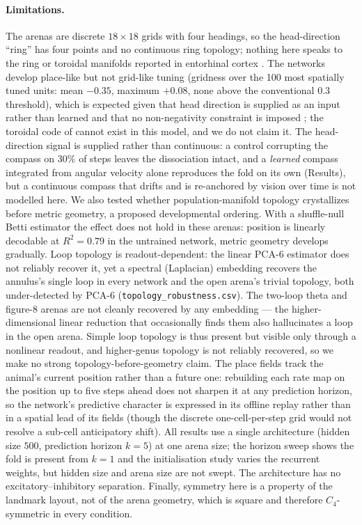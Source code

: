 \documentclass[9pt,lineno]{elife}
\begin{document}
\paragraph{Limitations.} The arenas are discrete $18\times18$ grids with four headings, so the
head-direction ``ring'' has four points and no continuous ring topology; nothing here speaks to
the ring or toroidal manifolds reported in entorhinal cortex \citep{gardner2022toroidal}. The networks
develop place-like but not grid-like tuning (gridness over the 100 most spatially tuned units:
mean $-0.35$, maximum $+0.08$, none above the conventional $0.3$ threshold), which is expected
given that head direction is supplied as an input rather than learned and that no
non-negativity constraint is imposed \citep{sorscher2023unified}; the toroidal code of
\citet{gardner2022toroidal} cannot exist in this model, and we do not claim it. The
head-direction signal is supplied rather than continuous: a control corrupting the compass on
$30\%$ of steps leaves the dissociation intact, and a \emph{learned} compass integrated from
angular velocity alone reproduces the fold on its own (Results), but a continuous compass that
drifts and is re-anchored by vision over time is not modelled here.
We also tested whether
population-manifold topology crystallizes before metric geometry, a proposed developmental
ordering. With a shuffle-null Betti estimator the effect does not hold in these arenas:
position is linearly decodable at $R^2 = 0.79$ in the untrained network, metric geometry
develops gradually. Loop topology is readout-dependent: the linear PCA-6 estimator does not
reliably recover it, yet a spectral (Laplacian) embedding recovers the annulus's single loop in
every network and the open arena's trivial topology, both under-detected by PCA-6
(\texttt{topology\_robustness.csv}). The two-loop theta and figure-8 arenas are not cleanly
recovered by any embedding --- the higher-dimensional linear reduction that occasionally finds
them also hallucinates a loop in the open arena. Simple loop topology is thus present but visible
only through a nonlinear readout, and higher-genus topology is not reliably recovered, so we make
no strong topology-before-geometry claim. The place fields track the animal's current position rather
than a future one: rebuilding each rate map on the position up to five steps ahead does not
sharpen it at any prediction horizon, so the network's predictive character is expressed in its
offline replay rather than in a spatial lead of its fields (though the discrete one-cell-per-step
grid would not resolve a sub-cell anticipatory shift). All results use a single architecture (hidden size $500$,
prediction horizon $k=5$) at one arena size; the horizon sweep shows the fold is present from
$k=1$ and the initialisation study varies the recurrent weights, but hidden size and arena size
are not swept. The architecture has no excitatory--inhibitory separation.
Finally, symmetry here is a property of the landmark layout, not of the arena geometry, which is
square and therefore $C_4$-symmetric in every condition.
\end{document}
